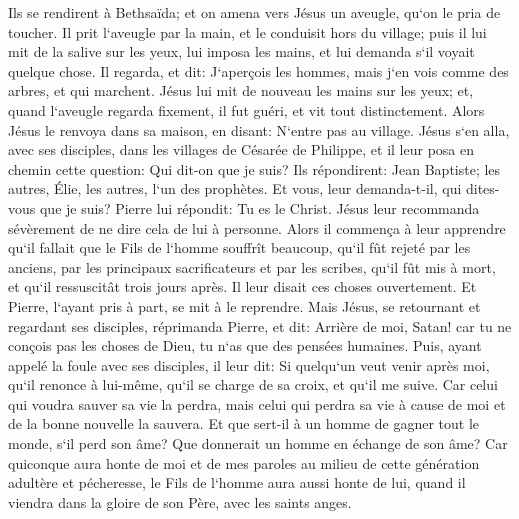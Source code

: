 \verse Ils se rendirent à Bethsaïda; et on amena vers Jésus un aveugle, qu`on le pria de toucher. 
\verse Il prit l`aveugle par la main, et le conduisit hors du village; puis il lui mit de la salive sur les yeux, lui imposa les mains, et lui demanda s`il voyait quelque chose. 
\verse Il regarda, et dit: J`aperçois les hommes, mais j`en vois comme des arbres, et qui marchent. 
\verse Jésus lui mit de nouveau les mains sur les yeux; et, quand l`aveugle regarda fixement, il fut guéri, et vit tout distinctement. 
\verse Alors Jésus le renvoya dans sa maison, en disant: N`entre pas au village. 
\verse Jésus s`en alla, avec ses disciples, dans les villages de Césarée de Philippe, et il leur posa en chemin cette question: Qui dit-on que je suis? 
\verse Ils répondirent: Jean Baptiste; les autres, Élie, les autres, l`un des prophètes. 
\verse Et vous, leur demanda-t-il, qui dites-vous que je suis? Pierre lui répondit: Tu es le Christ. 
\verse Jésus leur recommanda sévèrement de ne dire cela de lui à personne. 
\verse Alors il commença à leur apprendre qu`il fallait que le Fils de l`homme souffrît beaucoup, qu`il fût rejeté par les anciens, par les principaux sacrificateurs et par les scribes, qu`il fût mis à mort, et qu`il ressuscitât trois jours après. 
\verse Il leur disait ces choses ouvertement. Et Pierre, l`ayant pris à part, se mit à le reprendre. 
\verse Mais Jésus, se retournant et regardant ses disciples, réprimanda Pierre, et dit: Arrière de moi, Satan! car tu ne conçois pas les choses de Dieu, tu n`as que des pensées humaines. 
\verse Puis, ayant appelé la foule avec ses disciples, il leur dit: Si quelqu`un veut venir après moi, qu`il renonce à lui-même, qu`il se charge de sa croix, et qu`il me suive. 
\verse Car celui qui voudra sauver sa vie la perdra, mais celui qui perdra sa vie à cause de moi et de la bonne nouvelle la sauvera. 
\verse Et que sert-il à un homme de gagner tout le monde, s`il perd son âme? 
\verse Que donnerait un homme en échange de son âme? 
\verse Car quiconque aura honte de moi et de mes paroles au milieu de cette génération adultère et pécheresse, le Fils de l`homme aura aussi honte de lui, quand il viendra dans la gloire de son Père, avec les saints anges. 

\chapter{}

